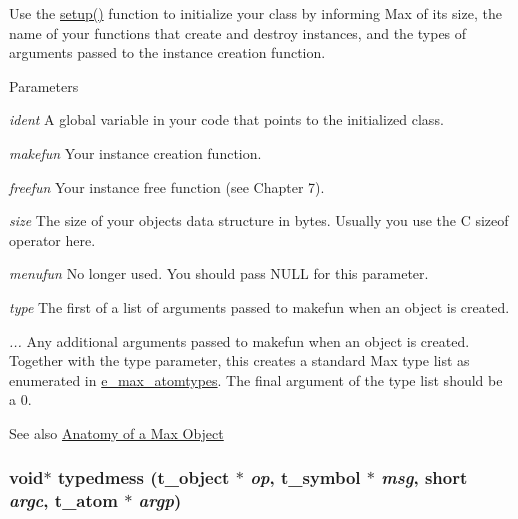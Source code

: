 Use the \hyperlink{group__class__old_ga24bbc5a9e8f7bb0a1c6847326e2f0a20}{setup()} function to initialize your class by informing Max of its size, the name of your functions that create and destroy instances, and the types of arguments passed to the instance creation function. 
\begin{DoxyParams}{Parameters}
\item[{\em ident}]A global variable in your code that points to the initialized class. \item[{\em makefun}]Your instance creation function. \item[{\em freefun}]Your instance free function (see Chapter 7). \item[{\em size}]The size of your objects data structure in bytes. Usually you use the C sizeof operator here. \item[{\em menufun}]No longer used. You should pass NULL for this parameter. \item[{\em type}]The first of a list of arguments passed to makefun when an object is created. \item[{\em ...}]Any additional arguments passed to makefun when an object is created. Together with the type parameter, this creates a standard Max type list as enumerated in \hyperlink{group__atom_ga8aa6700e9f00b132eb376db6e39ade47}{e\_\-max\_\-atomtypes}. The final argument of the type list should be a 0. \end{DoxyParams}
\begin{DoxySeeAlso}{See also}
\hyperlink{chapter_anatomy}{Anatomy of a Max Object} 
\end{DoxySeeAlso}
\hypertarget{group__class__old_ga78c60eb0068bce55eaa635e206cba52e}{
\subsubsection[{typedmess}]{\setlength{\rightskip}{0pt plus 5cm}void$\ast$ typedmess ({\bf t\_\-object} $\ast$ {\em op}, \/  {\bf t\_\-symbol} $\ast$ {\em msg}, \/  short {\em argc}, \/  {\bf t\_\-atom} $\ast$ {\em argp})}}
\label{group__class__old_ga78c60eb0068bce55eaa635e206cba52e}


